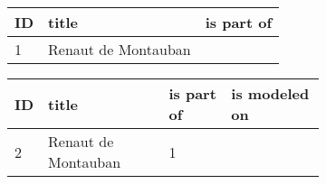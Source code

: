 \begin{figure}[ht]

    \begin{subfigure}{\textwidth}
        \begin{center}
        \begin{tabular}{|p{}|p{}|p{}|}
            \hline
            \textbf{ID} & \textbf{title} & \textbf{is part of} \\ \hline
            1 & Renaut de Montauban & \\ \hline
        \end{tabular}
        \end{center}
    \label{sub:Cycle}
    \vspace*{1em}
    \end{subfigure}

    \begin{subfigure}{\textwidth}
        \begin{center}
        \begin{tabular}{|p{}|p{}|p{}|p{}|}
            \hline
            \textbf{ID} & \textbf{title} & \textbf{is part of} & \textbf{is modeled on} \\ \hline
            2 & Renaut de Montauban & 1 & \\ \hline
        \end{tabular}
        \end{center}
    \label{sub:Work}
    \vspace*{1em}
    \end{subfigure}


\end{figure}
